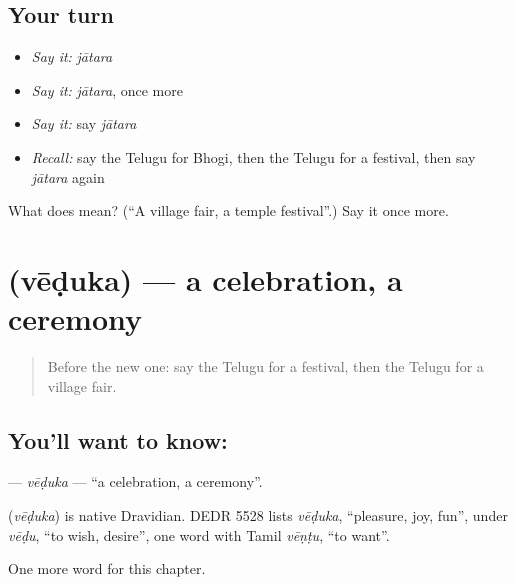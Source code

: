\subsection*{Your turn}
\begin{itemize}
\raggedright
  \item \emph{Say it:} \emph{jātara}
  \item \emph{Say it:} \emph{jātara}, once more
  \item \emph{Say it:} say \emph{jātara}
  \item \emph{Recall:} say the Telugu for Bhogi, then the Telugu for a festival, then say \emph{jātara} again
\end{itemize}

\begin{tcolorbox}[breakable,colback=teal!4,colframe=teal!35!black,title={Before you move on}]
What does  mean? (\textquotedblleft{}A village fair, a temple festival\textquotedblright{}.) Say it once more.
\end{tcolorbox}
\section[\texorpdfstring{\te{వేడుక} (vēḍuka)}{వేడుక (vēḍuka)}]{ (vēḍuka) — a celebration, a ceremony}

\label{lesson:TE-C289-veduka}



\begin{quote}
Before the new one: say the Telugu for a festival, then the Telugu for a village fair.
\end{quote}

\subsection*{You'll want to know: }
\textbf{} — \emph{vēḍuka} — \textquotedblleft{}a celebration, a ceremony\textquotedblright{}.

\begin{cousinweb}
\textbf{} (\emph{vēḍuka}) is native Dravidian. DEDR 5528 lists \emph{vēḍuka}, \textquotedblleft{}pleasure, joy, fun\textquotedblright{}, under \emph{vēḍu}, \textquotedblleft{}to wish, desire\textquotedblright{}, one word with Tamil \emph{vēṇṭu}, \textquotedblleft{}to want\textquotedblright{}.
\end{cousinweb}

\begin{grammarlens}[title={What you've built}]
One more word for this chapter.
\end{grammarlens}

